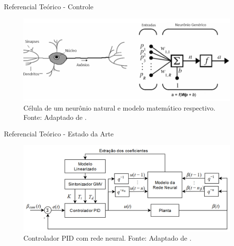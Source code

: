 \documentclass{beamer}
\begin{document}

\begin{frame}{Referencial Teórico - Controle}
    \begin{figure}[HT]
		\begin{center}
		\captionsetup{justification=centering}
        \includegraphics[scale=.35]{../referencial/img/neuronio_unal_p6}
        \caption{Célula de um neurônio natural e modelo matemático respectivo. \newline
        		 Fonte: Adaptado de  .}
		\label{FIG_ADAPTATIVO}
        \end{center}
	\end{figure}
\end{frame}


\begin{frame}{Referencial Teórico - Estado da Arte}
    \begin{figure}[HT]
		\begin{center}
		\captionsetup{justification=centering}
        \includegraphics[scale=.42]{../referencial/img/pid_neural_chen_p212}
        \caption{Controlador PID com rede neural. \newline
        		 Fonte: Adaptado de .}
		\label{FIG_ADAPTATIVO}
        \end{center}
	\end{figure}
\end{frame}
\end{document}
